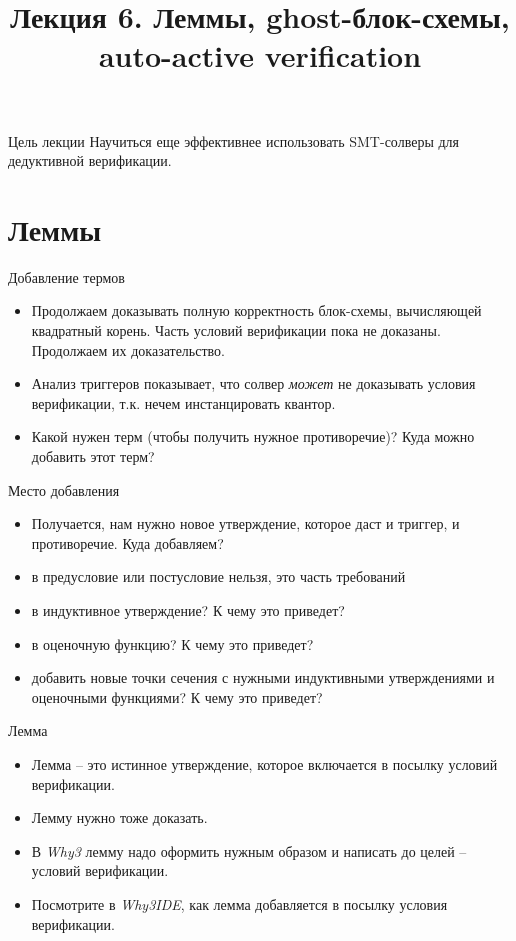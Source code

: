 \documentclass[hyperref={unicode=true}]{beamer}
\title{Лекция 6. Леммы, ghost-блок-схемы, auto-active verification}
\author{}
\date{}
\begin{document}
	\begin{frame}{}
		\titlepage
	\end{frame}

    \begin{frame}{Цель лекции}
    Научиться еще эффективнее использовать SMT-солверы
    для дедуктивной верификации.
    \end{frame}

    \section{Леммы}

    \begin{frame}{Добавление термов}
    \begin{itemize}
    \item
    Продолжаем доказывать полную корректность блок-схемы,
    вычисляющей квадратный корень. Часть условий верификации
    пока не доказаны. Продолжаем их доказательство.
    \item
    Анализ триггеров показывает, что солвер \emph{может}
    не доказывать условия верификации, т.к. нечем инстанцировать
    квантор.
    \item
    Какой нужен терм (чтобы получить нужное противоречие)?
    Куда можно добавить этот терм?
    \end{itemize}
    \end{frame}

    \begin{frame}{Место добавления}
    \begin{itemize}
    \item
    Получается, нам нужно новое утверждение, которое даст и триггер,
    и противоречие. Куда добавляем?
    \item
    в предусловие или постусловие нельзя, это часть требований
    \item
    в индуктивное утверждение? К чему это приведет?
    \item
    в оценочную функцию? К чему это приведет?
    \item
    добавить новые точки сечения с нужными индуктивными утверждениями
    и оценочными функциями? К чему это приведет?
    \end{itemize}
    \end{frame}

    \begin{frame}{Лемма}
    \begin{itemize}
    \item
    Лемма -- это истинное утверждение, которое включается в посылку
    условий верификации.
    \item
    Лемму нужно тоже доказать.
    \item
    В \textsl{Why3} лемму надо оформить нужным образом и написать
    до целей -- условий верификации.
    \item
    Посмотрите в \textsl{Why3IDE}, как лемма добавляется в посылку
    условия верификации.
    \end{itemize}
    \end{frame}
\end{document}
